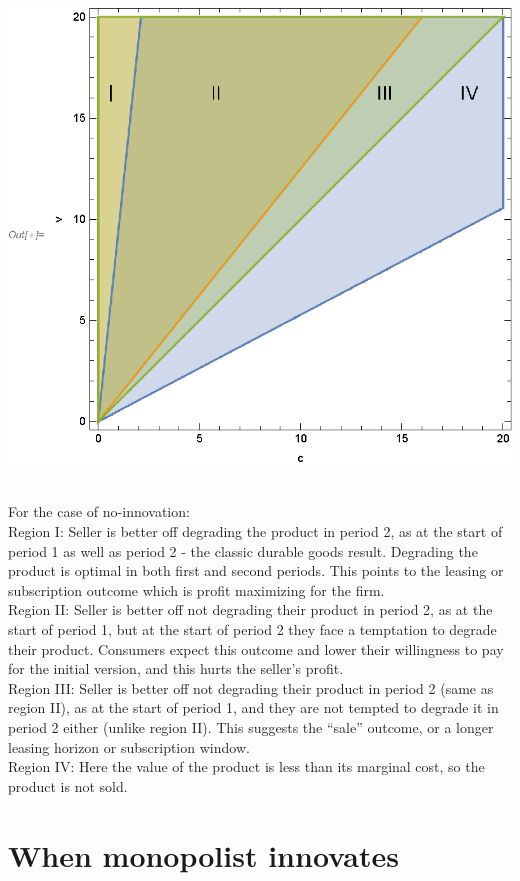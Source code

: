 \documentclass{article}
\begin{document}
\includegraphics{2020_05_19-overleaf-mirror_gr3.eps}

 \\
For the case of no-innovation:\\
Region I: Seller is better off degrading the product in period 2, as at the start of period 1 as well as period 2 { }- the classic durable goods
result. Degrading the product is optimal in both first and second periods. This points to the leasing or subscription outcome which is profit maximizing
for the firm.\\
Region II: Seller is better off not degrading their product in period 2, as at the start of period 1, but at the start of period 2 they face a temptation
to degrade their product. Consumers expect this outcome and lower their willingness to pay for the initial version, and this hurts the seller{'}s
profit.\\
Region III: Seller is better off not degrading their product in period 2 (same as region II), as at the start of period 1, and they are not tempted
to degrade it in period 2 either (unlike region II). This suggests the {``}sale{''} outcome, or a longer leasing horizon or subscription window.
\\
Region IV: Here the value of the product is less than its marginal cost, so the product is not sold. 

\section*{When monopolist innovates }
\end{document}
